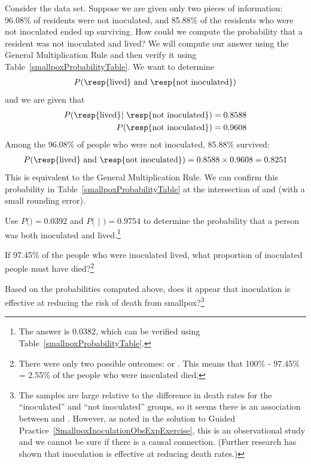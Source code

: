 \begin{example}{Consider the  data set. Suppose we are given only two pieces of information: 96.08\% of residents were not inoculated, and 85.88\% of the residents who were not inoculated ended up surviving. How could we compute the probability that a resident was not inoculated and lived?}
We will compute our answer using the General Multiplication Rule and then verify it using Table~\ref{smallpoxProbabilityTable}. We want to determine
\begin{eqnarray*}
P(\text{\resp{lived} and \resp{not inoculated}})
\end{eqnarray*}
and we are given that
\begin{eqnarray*}
P(\text{\resp{lived}}|\text{ \resp{not inoculated}})=0.8588 \\
P(\text{\resp{not inoculated}})=0.9608
\end{eqnarray*}
Among the 96.08\% of people who were not inoculated, 85.88\% survived:
\begin{eqnarray*}
P(\text{\resp{lived} and \resp{not inoculated}}) = 0.8588\times 0.9608 = 0.8251
\end{eqnarray*}
This is equivalent to the General Multiplication Rule. We can confirm this probability in Table~\ref{smallpoxProbabilityTable} at the intersection of  and  (with a small rounding error).
\end{example}

\begin{exercise}
Use $P($$) = 0.0392$ and $P($ $|$ $) = 0.9754$ to determine the probability that a person was both inoculated and lived.\footnote{The answer is 0.0382, which can be verified using Table~\ref{smallpoxProbabilityTable}.}
\end{exercise}

\begin{exercise}
If 97.45\% of the people who were inoculated lived, what proportion of inoculated people must have died?\footnote{There were only two possible outcomes:  or . This means that 100\% - 97.45\% = 2.55\% of the people who were inoculated died.}
\end{exercise}

\begin{exercise}
Based on the probabilities computed above, does it appear that inoculation is effective at reducing the risk of death from smallpox?\footnote{The samples are large relative to the difference in death rates for the ``inoculated'' and ``not inoculated'' groups, so it seems there is an association between  and . However, as noted in the solution to Guided Practice~\ref{SmallpoxInoculationObsExpExercise}, this is an observational study and we cannot be sure if there is a causal connection. (Further research has shown that inoculation is effective at reducing death rates.)}
\end{exercise}


